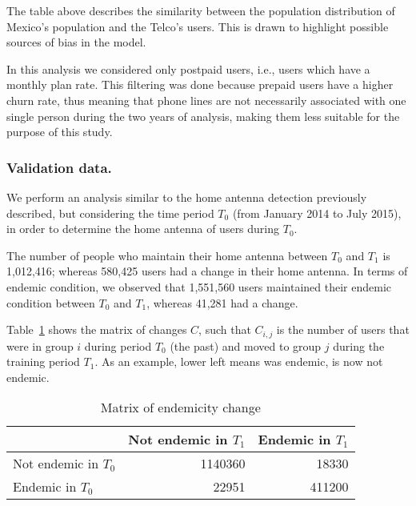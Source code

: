 The table above describes the similarity between the population distribution of Mexico's population and the Telco's users. This is drawn to highlight possible sources of bias in the model.

In this analysis we considered only postpaid users, i.e., users which have a monthly  plan rate. This filtering was done because prepaid users have a higher churn rate, thus meaning that phone lines are not necessarily associated with one single person during the two years of analysis, making them less suitable for the purpose of this study.





\subsubsection{Validation data.} %

We perform an analysis similar to the home antenna detection previously described, 
but considering the time period $T_0$ (from January 2014 to July 2015),
in order to determine the home antenna of users during $T_0$.

The number of people who maintain their home antenna between $T_0$ and $T_1$ is 1,012,416;
whereas 580,425 users had a change in their home antenna.
In terms of endemic condition, we observed that 1,551,560 users maintained their endemic condition
between $T_0$ and $T_1$, whereas 41,281 had a change.


%
%
%

Table~\cref{tab:changes} 
shows the matrix of changes $C$, such that $C_{i, j}$ is the number of users that were in group $i$ during period $T_0$ (the past) and moved to group $j$ during the training period $T_1$. As an example, lower left means was endemic, is now not endemic. 

\begin{table}[ht]
	\caption{Matrix of endemicity change}
	\label{tab:changes}
	\centering
	\begin{tabular}{l r r }
		\toprule
		& Not endemic in $T_1$ & Endemic in $T_1$ \\
		\midrule
		Not endemic in $T_0$ & 1140360 & 18330   \\
		Endemic in $T_0$       & 22951    & 411200 \\
		\bottomrule
	\end{tabular}
\end{table}

